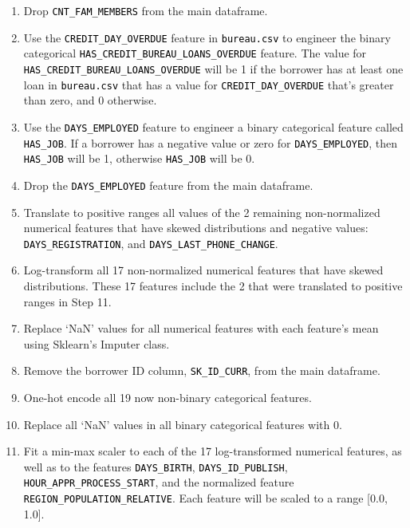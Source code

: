 \documentclass[12pt, letterpaper]{article}
\begin{document}
\begin{enumerate}
  \item Drop \colorbox{backcolor}{\textcolor{black}{\texttt{CNT_FAM_MEMBERS}}} from the main dataframe.
  \item Use the \colorbox{backcolor}{\textcolor{black}{\texttt{CREDIT_DAY_OVERDUE}}} feature in \colorbox{backcolor}{\textcolor{black}{\texttt{bureau.csv}}} to engineer the binary categorical \colorbox{backcolor}{\textcolor{black}{\texttt{HAS_CREDIT_BUREAU_LOANS_OVERDUE}}} feature. The value for \colorbox{backcolor}{\textcolor{black}{\texttt{HAS_CREDIT_BUREAU_LOANS_OVERDUE}}} will be 1 if the borrower has at least one loan in \colorbox{backcolor}{\textcolor{black}{\texttt{bureau.csv}}} that has a value for \colorbox{backcolor}{\textcolor{black}{\texttt{CREDIT_DAY_OVERDUE}}} that's greater than zero, and 0 otherwise.
  \item Use the \colorbox{backcolor}{\textcolor{black}{\texttt{DAYS_EMPLOYED}}} feature to engineer a binary categorical feature called \colorbox{backcolor}{\textcolor{black}{\texttt{HAS_JOB}}}. If a borrower has a negative value or zero for \colorbox{backcolor}{\textcolor{black}{\texttt{DAYS_EMPLOYED}}}, then \colorbox{backcolor}{\textcolor{black}{\texttt{HAS_JOB}}} will be 1, otherwise \colorbox{backcolor}{\textcolor{black}{\texttt{HAS_JOB}}} will be 0.
  \item Drop the \colorbox{backcolor}{\textcolor{black}{\texttt{DAYS_EMPLOYED}}} feature from the main dataframe.
  \item Translate to positive ranges all values of the 2 remaining non-normalized numerical features that have skewed distributions and negative values: \colorbox{backcolor}{\textcolor{black}{\texttt{DAYS_REGISTRATION}}}, and \colorbox{backcolor}{\textcolor{black}{\texttt{DAYS_LAST_PHONE_CHANGE}}}.
  \item Log-transform all 17 non-normalized numerical features that have skewed distributions. These 17 features include the 2 that were translated to positive ranges in Step 11.
  \item Replace `NaN' values for all numerical features with each feature's mean using Sklearn's Imputer class.
  \item Remove the borrower ID column, \colorbox{backcolor}{\textcolor{black}{\texttt{SK_ID_CURR}}}, from the main dataframe.
  \item One-hot encode all 19 now non-binary categorical features.
  \item Replace all `NaN' values in all binary categorical features with 0.
  \item Fit a min-max scaler to each of the 17 log-transformed numerical features, as well as to the features \colorbox{backcolor}{\textcolor{black}{\texttt{DAYS_BIRTH}}}, \colorbox{backcolor}{\textcolor{black}{\texttt{DAYS_ID_PUBLISH}}}, \colorbox{backcolor}{\textcolor{black}{\texttt{HOUR_APPR_PROCESS_START}}}, and the normalized feature \colorbox{backcolor}{\textcolor{black}{\texttt{REGION_POPULATION_RELATIVE}}}. Each feature will be scaled to a range [0.0, 1.0].

\end{enumerate}
\end{document}
